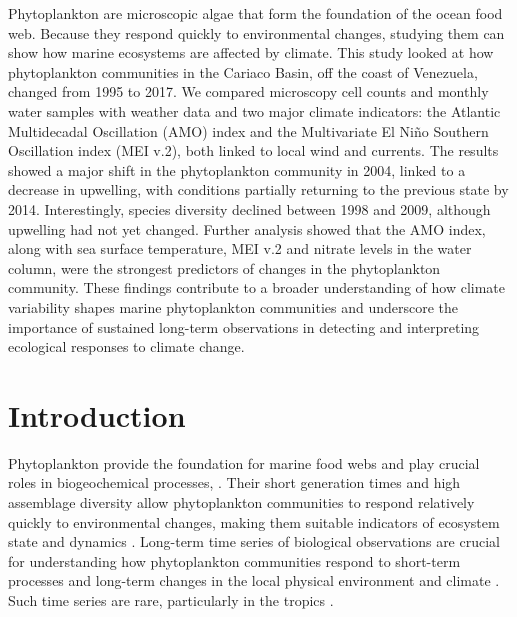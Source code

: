 \documentclass[draft]{agujournal2019}
\begin{document}
Phytoplankton are microscopic algae that form the foundation of the ocean food web. Because they respond quickly to environmental changes, studying them can show how marine ecosystems are affected by climate.
This study looked at how phytoplankton communities in the Cariaco Basin, off the coast of Venezuela, changed from 1995 to 2017. We compared microscopy cell counts and monthly water samples with weather data and two major climate indicators: the Atlantic Multidecadal Oscillation (AMO) index and the Multivariate El Niño Southern Oscillation index (MEI v.2), both linked to local wind and currents.
The results showed a major shift in the phytoplankton community in 2004, linked to a decrease in upwelling, with conditions partially returning to the previous state by 2014. Interestingly, species diversity declined between 1998 and 2009, although upwelling had not yet changed. Further analysis showed that the AMO index, along with sea surface temperature, MEI v.2 and nitrate levels in the water column, were the strongest predictors of changes in the phytoplankton community.
These findings contribute to a broader understanding of how climate variability shapes marine phytoplankton communities and underscore the importance of sustained long-term observations in detecting and interpreting ecological responses to climate change.








\section{Introduction}
%


Phytoplankton provide the foundation for marine food webs and play crucial roles in biogeochemical processes, \cite{falkowski_biogeochemical_1998}. Their short generation times and high assemblage diversity allow phytoplankton communities to respond relatively quickly to environmental changes, making them suitable indicators of ecosystem state and dynamics \cite{alvarez-cobelas_what_1998, barton_anthropogenic_2016, di_cavalho_temporal_2023}. Long-term time series of biological observations are crucial for understanding how phytoplankton communities respond to short-term processes and long-term changes in the local physical environment and climate \cite{carstensen_need_2014, henson_observing_2016}. Such time series are rare, particularly in the tropics \cite{clarke_does_2017}. 
\end{document}
